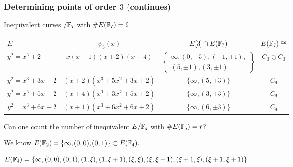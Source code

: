 \documentclass[10pt,handout]{beamer} %
\begin{document}
\begin{frame}\frametitle{Determining points of order $3$ (continues)}

\begin{scriptsize}
\begin{block}{Inequivalent curves $/\mathbb F_7$ with $\#E(\mathbb F_7)=9$.}
\begin{tabular}{|l|c|c|c|}
\hline
 $E$ & $\psi_3(x)$ & $E[3]\cap E(\mathbb F_7)$ & $\!\!\!E(\mathbb F_7)\cong\!\!\!$\\
\hline
 $\!\!y^2=x^3+2\!\!$ & $x(x + 1)(x + 2)(x + 4)$ &$\!\!\!\left\{\!\!\!\begin{array}{l}
\infty,(0,\pm3),(-1,\pm1),\!\!\! \\ (5,\pm1),(3,\pm1)\end{array}\!\!\!\!\right\}\!\!$
& $\!\!\!C_3\oplus C_3\!\!\!$\\
\hline
$\!\!y^2=x^3+3x+2\!\!$ & $\!\!(x + 2)(x^3 + 5x^2 + 3x + 2)\!\!$ & $\{\infty,(5,\pm3)\}$ & $C_9$ \\
\hline
$\!\!y^2=x^3+5x+2\!\!$ & $\!\!(x + 4)(x^3 + 3x^2 + 5x + 2)\!\!$ & $\{\infty,(3,\pm3)\}$ & $C_9$ \\
\hline
$\!\!y^2=x^3+6x+2\!\!$ & $\!\!(x + 1)(x^3 + 6x^2 + 6x + 2)\!\!$ & $\{\infty,(6,\pm3)\}$ & $C_9$ \\
\hline
\end{tabular}
\end{block}\end{scriptsize}\pause

\begin{block}
{Can one count the number of inequivalent $E/\mathbb F_q$ with $\#E(\mathbb F_q)=r$?}
\end{block}

\begin{example}[A curve over $\F_4=\F_2(\xi), \xi^2=\xi+1;\qquad E: y^2+y=x^3$]\pause
 We know $E(\mathbb F_2)=\{\infty, (0,0), (0,1)\}\subset E(\mathbb F_4).$\pause\\
 \begin{scriptsize}$E(\mathbb F_4)=\{\infty,(0,0),(0,1),(1,\xi),(1,\xi+1),(\xi,\xi),(\xi,\xi+1),
 (\xi+1,\xi),(\xi+1,\xi+1)\}$\end{scriptsize} \pause

\end{example}


\end{frame}
\end{document}
